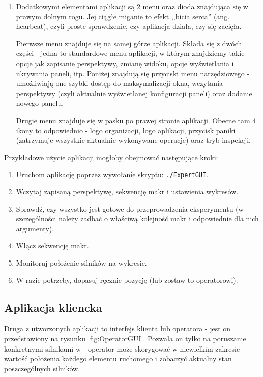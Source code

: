 \begin{enumerate}
	\item Dodatkowymi elementami aplikacji są 2 menu oraz dioda znajdująca się w prawym dolnym rogu. Jej ciągłe miganie to efekt ,,bicia serca'' (ang. hearbeat), czyli proste sprawdzenie, czy aplikacja działa, czy się zacięła.
	
	Pierwsze menu znajduje się na samej górze aplikacji. Składa się z dwóch części - jedna to standardowe menu aplikacji, w którym znajdziemy takie opcje jak zapisanie perspektywy, zmianę widoku, opcje wyświetlania i ukrywania paneli, itp. Poniżej znajdują się przyciski menu narzędziowego - umożliwiają one szybki dostęp do maksymalizacji okna, wczytania perspektywy (czyli aktualnie wyświetlanej konfiguracji paneli) oraz dodanie nowego panelu.
	
	Drugie menu znajduje się w pasku po prawej stronie aplikacji. Obecne tam 4 ikony to odpowiednio - logo organizacji, logo aplikacji, przycisk paniki (zatrzymuje wszystkie aktualnie wykonywane operacje) oraz tryb inspekcji.
\end{enumerate}

Przykładowe użycie aplikacji mogłoby obejmować następujące kroki:
\begin{enumerate}
	\item Uruchom aplikację poprzez wywołanie skryptu: \texttt{./ExpertGUI}.
	\item Wczytaj zapisaną perspektywę, sekwencję makr i ustawienia wykresów.
	\item Sprawdź, czy wszystko jest gotowe do przeprowadzenia eksperymentu (w szczególności należy zadbać o właściwą kolejność makr i odpowiednie dla nich argumenty).
	\item Włącz sekwencję makr.
	\item Monitoruj położenie silników na wykresie.
	\item W razie potrzeby, dopasuj ręcznie pozycję (lub zostaw to operatorowi).
\end{enumerate}


\subsection{Aplikacja kliencka}
\label{sub:operatorgui}

\quad Druga z utworzonych aplikacji to interfejs klienta lub operatora - jest on przedstawiony na rysunku \ref{fig:OperatorGUI}. Pozwala on tylko na poruszanie konkretnymi silnikami w - operator może skorygować w niewielkim zakresie wartość położenia każdego elementu ruchomego i zobaczyć aktualny stan poszczególnych silników.

